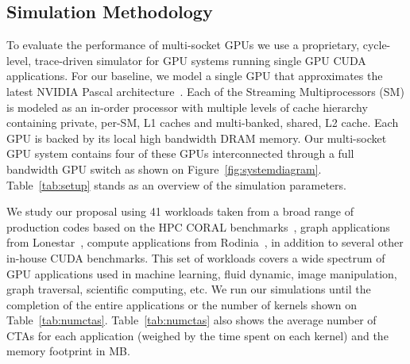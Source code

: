 \subsection{ Simulation Methodology}
\label{methodology}

To evaluate the performance of multi-socket GPUs we use a proprietary, 
cycle-level, trace-driven simulator for GPU systems running single GPU CUDA 
applications. For our baseline, we model a single GPU that approximates the 
latest NVIDIA Pascal architecture~\cite{inside-pascal}. Each of the 
Streaming Multiprocessors (SM) is modeled as an in-order processor with 
multiple levels of cache hierarchy containing private, per-SM, L1 caches and 
multi-banked, shared, L2 cache. Each GPU is backed by its local high 
bandwidth DRAM memory. Our multi-socket GPU system contains four of these 
GPUs interconnected through a full bandwidth GPU switch as shown on 
Figure~\ref{fig:systemdiagram}. Table~\ref{tab:setup} stands as an overview 
of the simulation parameters.

We study our proposal using 41 workloads taken from a broad range of 
production codes based on the HPC CORAL benchmarks~\cite{coral}, graph 
applications from Lonestar~\cite{lonestar}, compute applications from 
Rodinia~\cite{Che2009}, in addition to several other in-house CUDA benchmarks. 
This set of workloads covers a wide spectrum of GPU applications used in machine 
learning, fluid dynamic, image manipulation, graph traversal, scientific 
computing, etc. We run our simulations until the completion of the entire 
applications or the number of kernels shown on Table~\ref{tab:numctas}.
Table~\ref{tab:numctas} also shows the average number of CTAs for each
application (weighed by the time spent on each kernel) and the memory 
footprint in MB.

